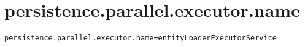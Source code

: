 \section{persistence.parallel.executor.name}
\label{configuration:PersistenceParallelExecutorName}
\AvailableInJavaOnly{\TODO}
\begin{lstlisting}[style=Props,caption={Usage example for \textit{persistence.parallel.executor.name}}]
persistence.parallel.executor.name=entityLoaderExecutorService
\end{lstlisting}